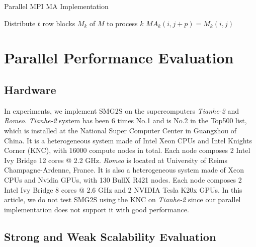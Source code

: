 \begin{algorithm}[htbp]{}
	\caption{Parallel MPI MA Implementation} 
	\label{alg:ma}   
	\begin{algorithmic}[1]
		\State Distribute $t$ row blocks $M_k$ of $M$ to process $k$ 
		\State $MA_k(i,j+p) = M_k(i,j)$
		\EndIf
		\EndFor
		\EndFor 
		\EndFunction
	\end{algorithmic} 
	
\end{algorithm}

\section{Parallel Performance Evaluation}
\subsection{Hardware}
In experiments, we implement SMG2S on the supercomputers \textit{Tianhe-2} and \textit{Romeo}. \textit{Tianhe-2} system has been 6 times No.1 and is No.2 in the Top500 list, which is installed at the National Super Computer Center in Guangzhou of China. It is a heterogeneous system made of Intel Xeon CPUs and Intel Knights Corner (KNC), with 16000 compute nodes in total. Each node composes 2 Intel Ivy Bridge 12 cores @ 2.2 GHz. \textit{Romeo} is located at University of Reims Champagne-Ardenne, France. It is also a heterogeneous system made of Xeon CPUs and Nvidia GPUs, with 130 BullX R421 nodes. Each node composes 2 Intel Ivy Bridge 8 cores @ 2.6 GHz and 2 NVIDIA Tesla K20x GPUs. In this article, we do not test SMG2S using the KNC on \textit{Tianhe-2} since our parallel implementation does not support it with good performance.
\subsection{Strong and Weak Scalability Evaluation}

